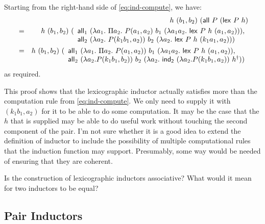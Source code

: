 \documentclass{amsart}
\begin{document}
Starting from the right-hand side of \autoref{eq:ind-compute}, we
have:
\begin{eqnarray*}
  & & h\ (b_1,b_2)\ (\mathsf{all}\ P\ (\mathsf{lex}\ P\ h) \\
  &=& h\ (b_1,b_2)\ (
  \begin{array}[t]{l}
    \mathsf{all}_1\ (\lambda a_1.\ \Pi a_2.\ P(a_1,a_2)\ b_1\ (\lambda a_1 a_2.\ \mathsf{lex}\ P\ h\ (a_1,a_2))), \\
    \mathsf{all}_2\ (\lambda a_2.\ P(k_1b_1, a_2))\ b_2\ (\lambda a_2.\ \mathsf{lex}\ P\ h\ (k_1 a_1, a_2)))
  \end{array} \\
  &=& h\ (b_1,b_2)\ (
  \begin{array}[t]{l}
    \all_1\ (\lambda a_1.\ \Pi a_2.\ P(a_1,a_2))\ b_1\ (\lambda a_1 a_2.\ \mathsf{lex}\ P\ h\ (a_1,a_2)), \\
    \all_2\ (\lambda a_2. P (k_1 b_1,b_2))\ b_2\ (\lambda a_2.\ \mathsf{ind_2}\ (\lambda a_2. P(k_1 b_1, a_2))\ h^\dagger))
  \end{array}
\end{eqnarray*}
as required.

\bigskip

  This proof shows that the
lexicographic inductor actually satisfies more than the computation
rule from \autoref{eq:ind-compute}. We only need to supply it with
$(k_1b_1,a_2)$ for it to be able to do some computation. It may be the
case that the $h$ that is supplied may be able to do useful work
without touching the second component of the pair. I'm not sure
whether it is a good idea to extend the definition of inductor to
include the possibility of multiple computational rules that the
induction function may support. Presumably, some way would be needed
of ensuring that they are coherent.

Is the construction of lexicographic inductors associative? What would
it mean for two inductors to be equal?

\subsection{Pair Inductors}
\end{document}
